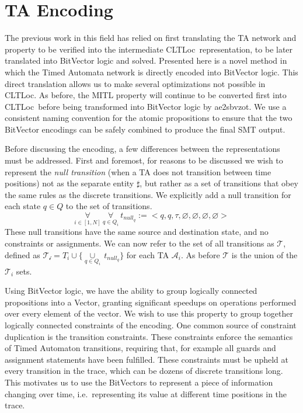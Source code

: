 \documentclass[a4paper,12pt]{article}
\newcommand{\cltloc}{CLTLoc}
\newcommand{\aez}{ae2sbvzot}
\begin{document}
\section{TA Encoding}\label{encoding}

The previous work in this field has relied on first translating the TA network
and property to be verified into the intermediate \cltloc\ representation, to be
later translated into BitVector logic and solved. Presented here is a novel
method in which the Timed Automata network is directly encoded into BitVector
logic. This direct translation allows us to make several optimizations not
possible in \cltloc. As before, the MITL property will continue to be converted
first into \cltloc\ before being transformed into BitVector logic by \aez. We
use a consistent naming convention for the atomic propositions to ensure that
the two BitVector encodings can be safely combined to produce the final SMT
output.

Before discussing the encoding, a few differences between the representations
must be addressed. First and foremost, for reasons to be discussed we wish to
represent the \emph{null transition} (when a TA does not transition between time
positions) not as the separate entity \(\sharp\), but rather as a set of
transitions that obey the same rules as the discrete transitions. We explicitly
add a null transition for each state \(q \in Q\) to the set of transitions.
\[\underset{i \in [1,N]}{\forall}\ \underset{q \in Q_{i}}{\forall}\ t_{null_q} := {<}q, q, \tau, \varnothing, \varnothing, \varnothing, \varnothing {>}\]
These null transitions have the same source and destination state, and no
constraints or assignments. We can now refer to the set of all transitions as
\(\mathcal{T}\), defined as
\(\mathcal{T_{i}} = T_{i} \cup \{\underset{q \in Q_{i}}{\cup}\ t_{null_{q}}\}\)
for each TA \(\mathcal{A}_{i}\). As before \(\mathcal{T}\) is the union of the
\(\mathcal{T}_{i}\) sets.


Using BitVector logic, we have the ability to group logically connected
propositions into a Vector, granting significant speedups on operations
performed over every element of the vector. We wish to use this property to
group together logically connected constraints of the encoding. One common
source of constraint duplication is the transition constraints. These
constraints enforce the semantics of Timed Automaton transitions, requiring
that, for example all guards and assignment statements have been fulfilled.
These constraints must be upheld at every transition in the trace, which can be
dozens of discrete transitions long. This motivates us to use the BitVectors to
represent a piece of information changing over time, i.e.\ representing its value
at different time positions in the trace.
\end{document}
